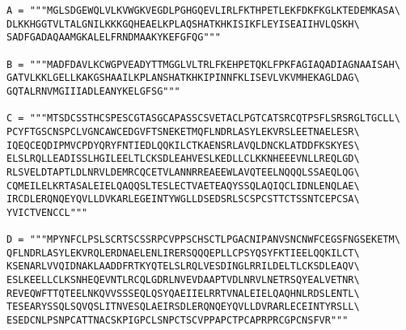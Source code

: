 \lstset{basicstyle=\footnotesize,style=myCustomMatlabStyle}
\begin{lstlisting}
A = """MGLSDGEWQLVLKVWGKVEGDLPGHGQEVLIRLFKTHPETLEKFDKFKGLKTEDEMKASA\
DLKKHGGTVLTALGNILKKKGQHEAELKPLAQSHATKHKISIKFLEYISEAIIHVLQSKH\
SADFGADAQAAMGKALELFRNDMAAKYKEFGFQG"""

B = """MADFDAVLKCWGPVEADYTTMGGLVLTRLFKEHPETQKLFPKFAGIAQADIAGNAAISAH\
GATVLKKLGELLKAKGSHAAILKPLANSHATKHKIPINNFKLISEVLVKVMHEKAGLDAG\
GQTALRNVMGIIIADLEANYKELGFSG"""

C = """MTSDCSSTHCSPESCGTASGCAPASSCSVETACLPGTCATSRCQTPSFLSRSRGLTGCLL\
PCYFTGSCNSPCLVGNCAWCEDGVFTSNEKETMQFLNDRLASYLEKVRSLEETNAELESR\
IQEQCEQDIPMVCPDYQRYFNTIEDLQQKILCTKAENSRLAVQLDNCKLATDDFKSKYES\
ELSLRQLLEADISSLHGILEELTLCKSDLEAHVESLKEDLLCLKKNHEEEVNLLREQLGD\
RLSVELDTAPTLDLNRVLDEMRCQCETVLANNRREAEEWLAVQTEELNQQQLSSAEQLQG\
CQMEILELKRTASALEIELQAQQSLTESLECTVAETEAQYSSQLAQIQCLIDNLENQLAE\
IRCDLERQNQEYQVLLDVKARLEGEINTYWGLLDSEDSRLSCSPCSTTCTSSNTCEPCSA\
YVICTVENCCL"""

D = """MPYNFCLPSLSCRTSCSSRPCVPPSCHSCTLPGACNIPANVSNCNWFCEGSFNGSEKETM\
QFLNDRLASYLEKVRQLERDNAELENLIRERSQQQEPLLCPSYQSYFKTIEELQQKILCT\
KSENARLVVQIDNAKLAADDFRTKYQTELSLRQLVESDINGLRRILDELTLCKSDLEAQV\
ESLKEELLCLKSNHEQEVNTLRCQLGDRLNVEVDAAPTVDLNRVLNETRSQYEALVETNR\
REVEQWFTTQTEELNKQVVSSSEQLQSYQAEIIELRRTVNALEIELQAQHNLRDSLENTL\
TESEARYSSQLSQVQSLITNVESQLAEIRSDLERQNQEYQVLLDVRARLECEINTYRSLL\
ESEDCNLPSNPCATTNACSKPIGPCLSNPCTSCVPPAPCTPCAPRPRCGPCNSFVR"""
\end{lstlisting}